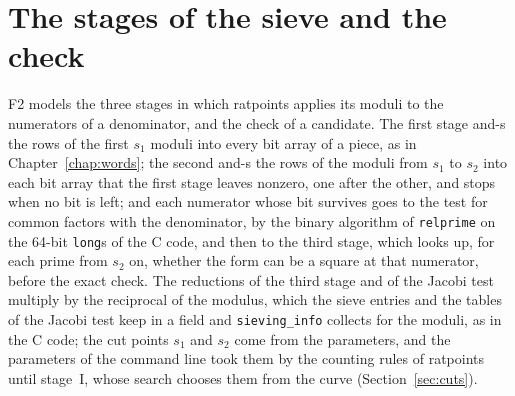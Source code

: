 \chapter{The stages of the sieve and the check}\label{chap:stages}

F2 models the three stages in which ratpoints applies its moduli to the numerators of a denominator,
and the check of a candidate. The first stage and-s the rows of the first $s_1$ moduli into every
bit array of a piece, as in Chapter~\ref{chap:words}; the second and-s the rows of the moduli from
$s_1$ to $s_2$ into each bit array that the first stage leaves nonzero, one after the other, and
stops when no bit is left; and each numerator whose bit survives goes to the test for common factors
with the denominator, by the binary algorithm of \verb|relprime| on the 64-bit \verb|long|s of the C
code, and then to the third stage, which looks up, for each prime from $s_2$ on, whether the form
can be a square at that numerator, before the exact check. The reductions of the third stage and of
the Jacobi test multiply by the reciprocal of the modulus, which the sieve entries and the tables of
the Jacobi test keep in a field and \verb|sieving_info| collects for the moduli, as in the C code;
the cut points $s_1$ and $s_2$ come from the parameters, and the parameters of the command line took
them by the counting rules of ratpoints until stage~I, whose search chooses them from the curve
(Section~\ref{sec:cuts}).

